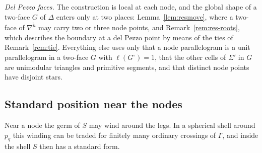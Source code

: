 \emph{Del Pezzo faces.} The construction is local at each node, and the global shape of a two-face $G$ of $\Delta$ enters
only at two places: Lemma~\ref{lem:resmove}, where a two-face of $\nabla^{\check h}$ may carry two or three node points, and
Remark~\ref{rem:res-roots}, which describes the boundary at a del Pezzo point by means of the ties of Remark~\ref{rem:tie}. Everything
else uses only that a node parallelogram is a unit parallelogram in a two-face $G$ with $\ell(G^\circ)=1$, that the other cells
of $\Sigma'$ in $G$ are unimodular triangles and primitive segments, and that distinct node points have disjoint stars.

\subsection{Standard position near the nodes}\label{ssec:res-shell}
Near a node the germ of $S$ may wind around the legs. In a spherical shell around $p_q$ this winding can be traded for
finitely many ordinary crossings of $\Gamma$, and inside the shell $S$ then has a standard form.

